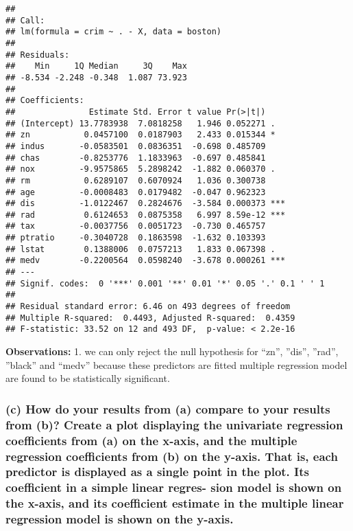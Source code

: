 \documentclass[
]{article}
\begin{document}
\begin{verbatim}
## 
## Call:
## lm(formula = crim ~ . - X, data = boston)
## 
## Residuals:
##    Min     1Q Median     3Q    Max 
## -8.534 -2.248 -0.348  1.087 73.923 
## 
## Coefficients:
##               Estimate Std. Error t value Pr(>|t|)    
## (Intercept) 13.7783938  7.0818258   1.946 0.052271 .  
## zn           0.0457100  0.0187903   2.433 0.015344 *  
## indus       -0.0583501  0.0836351  -0.698 0.485709    
## chas        -0.8253776  1.1833963  -0.697 0.485841    
## nox         -9.9575865  5.2898242  -1.882 0.060370 .  
## rm           0.6289107  0.6070924   1.036 0.300738    
## age         -0.0008483  0.0179482  -0.047 0.962323    
## dis         -1.0122467  0.2824676  -3.584 0.000373 ***
## rad          0.6124653  0.0875358   6.997 8.59e-12 ***
## tax         -0.0037756  0.0051723  -0.730 0.465757    
## ptratio     -0.3040728  0.1863598  -1.632 0.103393    
## lstat        0.1388006  0.0757213   1.833 0.067398 .  
## medv        -0.2200564  0.0598240  -3.678 0.000261 ***
## ---
## Signif. codes:  0 '***' 0.001 '**' 0.01 '*' 0.05 '.' 0.1 ' ' 1
## 
## Residual standard error: 6.46 on 493 degrees of freedom
## Multiple R-squared:  0.4493, Adjusted R-squared:  0.4359 
## F-statistic: 33.52 on 12 and 493 DF,  p-value: < 2.2e-16
\end{verbatim}

\textbf{Observations:} 1. we can only reject the null hypothesis for
``zn'', ''dis'', ''rad'', ''black'' and ``medv'' because these
predictors are fitted multiple regression model are found to be
statistically significant.

\hypertarget{c-how-do-your-results-from-a-compare-to-your-results-from-b-create-a-plot-displaying-the-univariate-regression-coefficients-from-a-on-the-x-axis-and-the-multiple-regression-coefficients-from-b-on-the-y-axis.-that-is-each-predictor-is-displayed-as-a-single-point-in-the-plot.-its-coefficient-in-a-simple-linear-regres--sion-model-is-shown-on-the-x-axis-and-its-coefficient-estimate-in-the-multiple-linear-regression-model-is-shown-on-the-y-axis.}{%
\subsubsection{(c) How do your results from (a) compare to your results
from (b)? Create a plot displaying the univariate regression
coefficients from (a) on the x-axis, and the multiple regression
coefficients from (b) on the y-axis. That is, each predictor is
displayed as a single point in the plot. Its coefficient in a simple
linear regres- sion model is shown on the x-axis, and its coefficient
estimate in the multiple linear regression model is shown on the
y-axis.}\label{c-how-do-your-results-from-a-compare-to-your-results-from-b-create-a-plot-displaying-the-univariate-regression-coefficients-from-a-on-the-x-axis-and-the-multiple-regression-coefficients-from-b-on-the-y-axis.-that-is-each-predictor-is-displayed-as-a-single-point-in-the-plot.-its-coefficient-in-a-simple-linear-regres--sion-model-is-shown-on-the-x-axis-and-its-coefficient-estimate-in-the-multiple-linear-regression-model-is-shown-on-the-y-axis.}}
\end{document}
